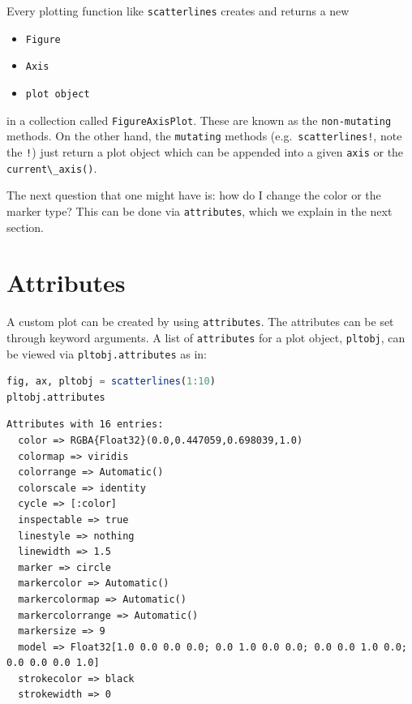 \documentclass[
  notoc %
]{tufte-book}
\providecommand{\tightlist}{%
  \setlength{\itemsep}{0pt}\setlength{\parskip}{0pt}
}
\newcommand{\passthrough}[1]{#1}
\begin{document}
Every plotting function like \passthrough{\lstinline!scatterlines!}
creates and returns a new

\begin{itemize}
\tightlist
\item
  \passthrough{\lstinline!Figure!}
\item
  \passthrough{\lstinline!Axis!}
\item
  \passthrough{\lstinline!plot object!}
\end{itemize}

in a collection called \passthrough{\lstinline!FigureAxisPlot!}. These
are known as the \passthrough{\lstinline!non-mutating!} methods. On the
other hand, the \passthrough{\lstinline!mutating!} methods
(e.g.~\passthrough{\lstinline"scatterlines!"}, note the
\passthrough{\lstinline"!"}) just return a plot object which can be
appended into a given \passthrough{\lstinline!axis!} or the
\passthrough{\lstinline!current\_axis()!}.

The next question that one might have is: how do I change the color or
the marker type? This can be done via
\passthrough{\lstinline!attributes!}, which we explain in the next
section.

\hypertarget{sec:datavisMakie_attributes}{%
\section{Attributes}\label{sec:datavisMakie_attributes}}

A custom plot can be created by using
\passthrough{\lstinline!attributes!}. The attributes can be set through
keyword arguments. A list of \passthrough{\lstinline!attributes!} for a
plot object, \passthrough{\lstinline!pltobj!}, can be viewed via
\passthrough{\lstinline!pltobj.attributes!} as in:

\begin{lstlisting}[language=Julia]
fig, ax, pltobj = scatterlines(1:10)
pltobj.attributes
\end{lstlisting}

\begin{lstlisting}[language=Output]
Attributes with 16 entries:
  color => RGBA{Float32}(0.0,0.447059,0.698039,1.0)
  colormap => viridis
  colorrange => Automatic()
  colorscale => identity
  cycle => [:color]
  inspectable => true
  linestyle => nothing
  linewidth => 1.5
  marker => circle
  markercolor => Automatic()
  markercolormap => Automatic()
  markercolorrange => Automatic()
  markersize => 9
  model => Float32[1.0 0.0 0.0 0.0; 0.0 1.0 0.0 0.0; 0.0 0.0 1.0 0.0; 0.0 0.0 0.0 1.0]
  strokecolor => black
  strokewidth => 0
\end{lstlisting}
\end{document}
